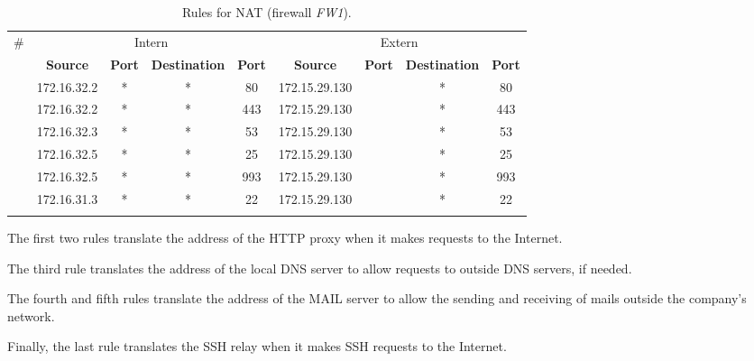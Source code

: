 \documentclass[a4paper, 12pt]{article}
\newcounter{idcounter}
\newcommand\id{\addtocounter{idcounter}{1}\theidcounter}
\newcounter{portcounter}
\newcommand\port{\addtocounter{portcounter}{1}\theportcounter}
\begin{document}
	\begin{footnotesize}
	    \begin{longtable}{|c||c|c|c|c||c|c|c|c|}
	        \hline
	        \multirow{2}{*}{\#} & \multicolumn{4}{|c||}{Intern} & \multicolumn{4}{c|}{Extern}\\ \cline{2-9}
	        & \textbf{Source} & \textbf{Port} & \textbf{Destination} & \textbf{Port} & \textbf{Source} & \textbf{Port} & \textbf{Destination} & \textbf{Port}\\ \hline
	        \id & 172.16.32.2 & * & * & 80 & 172.15.29.130 & \port & * & 80\\ \hline
	        \id & 172.16.32.2 & * & * & 443 & 172.15.29.130 & \port & * & 443\\ \hline
	        \id & 172.16.32.3 & * & * & 53 & 172.15.29.130 & \port & * & 53\\ \hline
	        \id & 172.16.32.5 & * & * & 25 & 172.15.29.130 & \port & * & 25\\ \hline
	        \id & 172.16.32.5 & * & * & 993 & 172.15.29.130 & \port & * & 993\\ \hline
	        \id & 172.16.31.3 & * & * & 22 & 172.15.29.130 & \port & * & 22\\ \hline
	        \caption{Rules for NAT (firewall \emph{FW1}).}
            \label{tab:rules.nat}
	    \end{longtable}
	\end{footnotesize}
	
	The first two rules translate the address of the HTTP proxy when it makes requests to the Internet.
	
	The third rule translates the address of the local DNS server to allow requests to outside DNS servers, if needed.
	
	The fourth and fifth rules translate the address of the MAIL server to allow the sending and receiving of mails outside the company's network.
	
	Finally, the last rule translates the SSH relay when it makes SSH requests to the Internet.
\end{document}
